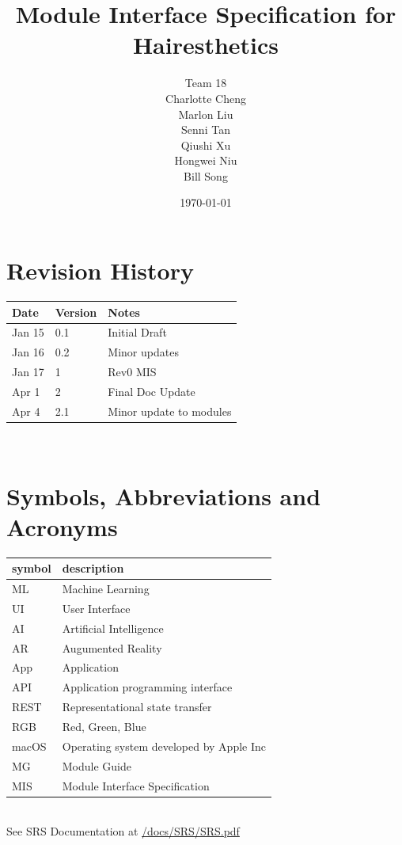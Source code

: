 \documentclass[12pt, titlepage]{article}
\begin{document}
\title{Module Interface Specification for Hairesthetics}

\author{Team 18 \\ Charlotte Cheng
        \\ Marlon Liu
        \\ Senni Tan
        \\ Qiushi Xu
        \\ Hongwei Niu
        \\ Bill Song
}

\date{\today}

\maketitle


\section{Revision History}

\begin{tabularx}{\textwidth}{p{3cm}p{2cm}X}
\toprule {\bf Date} & {\bf Version} & {\bf Notes}\\
\midrule
Jan 15 & 0.1 & Initial Draft\\
Jan 16 & 0.2 & Minor updates\\
Jan 17 & 1 & Rev0 MIS\\
Apr 1 & 2 & Final Doc Update\\
Apr 4 & 2.1 & Minor update to modules\\
\bottomrule
\end{tabularx}

~\newpage

\section{Symbols, Abbreviations and Acronyms}
\begin{tabular}{l l} 
  \toprule		
  \textbf{symbol} & \textbf{description}\\
  \midrule 
  ML & Machine Learning \\
  UI & User Interface\\
  AI & Artificial Intelligence \\
  AR & Augumented Reality \\
  App & Application \\
  API & Application programming interface\\
  REST & Representational state transfer\\
  RGB & Red, Green, Blue \\
  macOS & Operating system developed by Apple Inc \\
  MG & Module Guide \\
  MIS & Module Interface Specification \\
  \bottomrule
\end{tabular}\\
\newline
See SRS Documentation at \href{https://github.com/marlon4dashen/Hairesthetics/blob/main/docs/SRS/SRS.pdf}{/docs/SRS/SRS.pdf}
\end{document}
